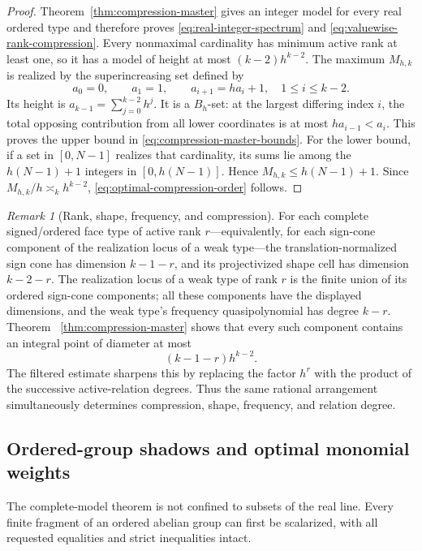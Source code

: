 \documentclass[11pt,reqno]{amsart}
\theoremstyle{definition}
\theoremstyle{remark}
\newtheorem{remark}[theorem]{Remark}
\begin{document}
\begin{proof}
Theorem~\ref{thm:compression-master} gives an integer model for every real
ordered type and therefore proves \eqref{eq:real-integer-spectrum} and
\eqref{eq:valuewise-rank-compression}.  Every nonmaximal cardinality has
minimum active rank at least one, so it has a model of height at most
$(k-2)h^{k-2}$.  The maximum $M_{h,k}$ is realized by the superincreasing set
defined by
\[
 a_0=0,\qquad a_1=1,\qquad a_{i+1}=ha_i+1,
 \quad 1\leq i\leq k-2.
\]
Its height is $a_{k-1}=\sum_{j=0}^{k-2}h^j$.  It is a $B_h$-set: at the
largest differing index $i$, the total opposing contribution from all lower
coordinates is at most $ha_{i-1}<a_i$.  This proves the
upper bound in \eqref{eq:compression-master-bounds}.  For the lower bound, if
a set in
$[0,N-1]$ realizes that cardinality, its sums lie among the $h(N-1)+1$
integers in $[0,h(N-1)]$.  Hence $M_{h,k}\leq h(N-1)+1$.  Since
$M_{h,k}/h\asymp_k h^{k-2}$, \eqref{eq:optimal-compression-order} follows.
\end{proof}

\begin{remark}[Rank, shape, frequency, and compression]
\label{rem:rank-shape-compression}
For each complete signed/ordered face type of active rank $r$---equivalently,
for each sign-cone component of the realization locus of a weak type---the
translation-normalized sign cone has dimension $k-1-r$, and its projectivized
shape cell has dimension $k-2-r$.  The realization locus of a weak type of
rank $r$ is the finite union of its ordered sign-cone components; all these
components have the displayed dimensions, and the weak type's frequency
quasipolynomial has degree $k-r$.  Theorem~
\ref{thm:compression-master} shows that every such component contains an
integral point of diameter at most
\[
 (k-1-r)h^{k-2}.
\]
The filtered estimate sharpens this by replacing the factor $h^r$ with the
product of the successive active-relation degrees.  Thus the same rational
arrangement simultaneously determines compression, shape, frequency, and
relation degree.
\end{remark}

\subsection{Ordered-group shadows and optimal monomial weights}
\label{subsec:finite-shadows}

The complete-model theorem is not confined to subsets of the real line.
Every finite fragment of an ordered abelian group can first be scalarized,
with all requested equalities and strict inequalities intact.
\end{document}
